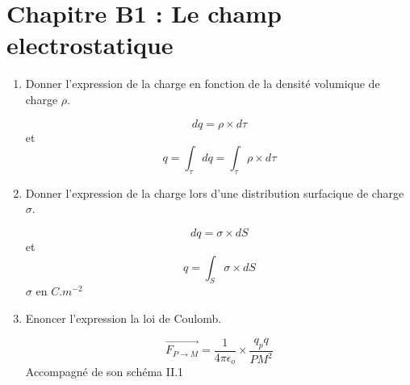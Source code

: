 \documentclass{article}
\begin{document}
\section*{\centering\huge Chapitre B1 : Le champ electrostatique}
\begin{enumerate}[label=\arabic{enumi} - , left=0pt, itemsep=1em]
    \item Donner l'expression de la charge en fonction de la densité volumique de charge $\rho$. \par
    \begin{solution}
          \[ dq = \rho \times d\tau \] et \[ q = \int_\tau dq = \int_\tau \rho \times d\tau \]
    \end{solution}
    \item Donner l'expression de la charge lors d'une distribution surfacique de charge $\sigma $. \par
    \begin{solution}
          \[ dq = \sigma \times dS \] et \[ q = \int_S \sigma \times dS \]
          $\sigma$ en $C.m^{-2}$
    \end{solution}
    \item Enoncer l'expression la loi de Coulomb. \par
    \begin{solution}
          \[ \overrightarrow{F_{P \to M}} = \frac{1}{4 \pi \epsilon_o} \times \frac{q_pq}{PM^2} \]
          Accompagné de son schéma II.1


\end{solution}
\end{enumerate}
\end{document}
